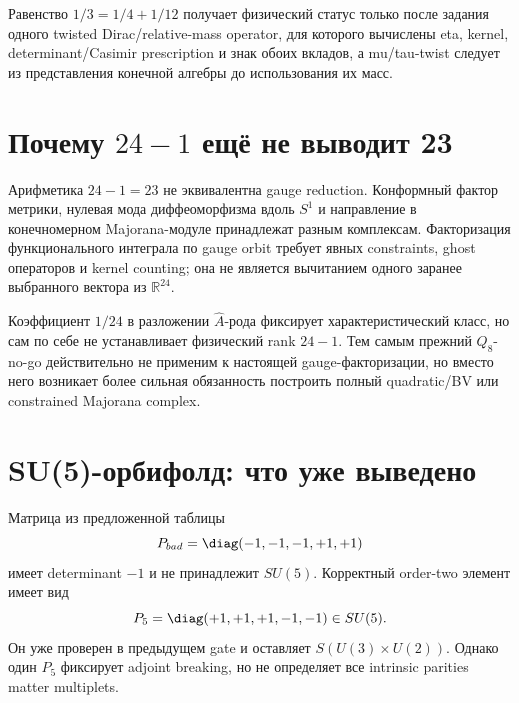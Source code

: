 \begin{nogocriterion}
Равенство \(1/3=1/4+1/12\) получает физический статус только после задания
одного twisted Dirac/relative-mass operator, для которого вычислены eta,
kernel, determinant/Casimir prescription и знак обоих вкладов, а
mu/tau-twist следует из представления конечной алгебры до использования их
масс.
\end{nogocriterion}

\section{Почему \texorpdfstring{\(24-1\)}{24-1} ещё не выводит 23}

Арифметика \(24-1=23\) не эквивалентна gauge reduction. Конформный фактор
метрики, нулевая мода диффеоморфизма вдоль \(S^1\) и направление в
конечномерном Majorana-модуле принадлежат разным комплексам. Факторизация
функционального интеграла по gauge orbit требует явных constraints, ghost
операторов и kernel counting; она не является вычитанием одного заранее
выбранного вектора из \(\mathbb R^{24}\).

Коэффициент \(1/24\) в разложении \(\widehat A\)-рода фиксирует
характеристический класс, но сам по себе не устанавливает физический rank
\(24-1\). Тем самым прежний \(Q_8\)-no-go действительно не применим к
настоящей gauge-факторизации, но вместо него возникает более сильная
обязанность построить полный quadratic/BV или constrained Majorana complex.

\section{SU(5)-орбифолд: что уже выведено}

Матрица из предложенной таблицы
\begin{equation}
 P_{bad}=\diag(-1,-1,-1,+1,+1)
\end{equation}
имеет determinant \(-1\) и не принадлежит \(SU(5)\). Корректный order-two
элемент имеет вид
\begin{equation}
 P_5=\diag(+1,+1,+1,-1,-1)\in SU(5).
\end{equation}
Он уже проверен в предыдущем gate и оставляет
\(S(U(3)\times U(2))\). Однако один \(P_5\) фиксирует adjoint breaking, но
не определяет все intrinsic parities matter multiplets.

